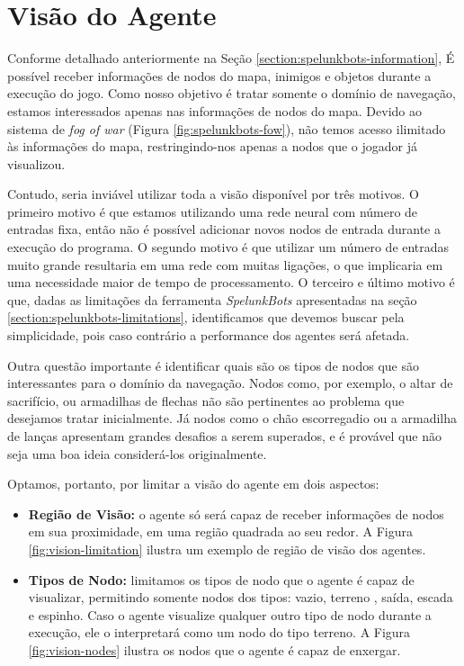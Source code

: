 \section{\label{section:modelling-vision}Visão do Agente}
Conforme detalhado anteriormente na Seção \ref{section:spelunkbots-information},
É possível receber informações de nodos do mapa, inimigos e objetos durante a
execução do jogo. Como nosso objetivo é tratar somente o domínio de navegação,
estamos interessados apenas nas informações de nodos do mapa. Devido ao sistema
de \textit{fog of war} (Figura \ref{fig:spelunkbots-fow}), não temos acesso
ilimitado às informações do mapa, restringindo-nos apenas a nodos que o jogador
já visualizou.

Contudo, seria inviável utilizar toda a visão disponível por três motivos. O
primeiro motivo é que estamos utilizando uma rede neural com número de entradas
fixa, então não é possível adicionar novos nodos de entrada durante a execução
do programa. O segundo motivo é que utilizar um número de entradas muito grande
resultaria em uma rede com muitas ligações, o que implicaria em uma necessidade
maior de tempo de processamento. O terceiro e último motivo é que, dadas as
limitações da ferramenta \textit{SpelunkBots} apresentadas na seção
\ref{section:spelunkbots-limitations}, identificamos que devemos buscar pela
simplicidade, pois caso contrário a performance dos agentes será afetada.

Outra questão importante é identificar quais são os tipos de nodos que são
interessantes para o domínio da navegação. Nodos como, por exemplo, o altar de
sacrifício, ou armadilhas de flechas não são pertinentes ao problema que
desejamos tratar inicialmente. Já nodos como o chão escorregadio ou a armadilha
de lanças apresentam grandes desafios a serem superados, e é provável que não
seja uma boa ideia considerá-los originalmente.

Optamos, portanto, por limitar a visão do agente em dois aspectos:

\begin{itemize}
	\item \textbf{Região de Visão:} o agente só será capaz de receber
		informações de nodos em sua proximidade, em uma região quadrada ao seu
		redor. A Figura \ref{fig:vision-limitation} ilustra um exemplo de região
		de visão dos agentes.

	\item \textbf{Tipos de Nodo:} limitamos os tipos de nodo que o agente é
		capaz de visualizar, permitindo somente nodos dos tipos: vazio, terreno
		, saída, escada e espinho. Caso o agente visualize qualquer outro tipo
		de nodo durante a execução, ele o interpretará como um nodo do tipo
		terreno. A Figura \ref{fig:vision-nodes} ilustra os nodos que o agente é
		capaz de enxergar.
\end{itemize}

